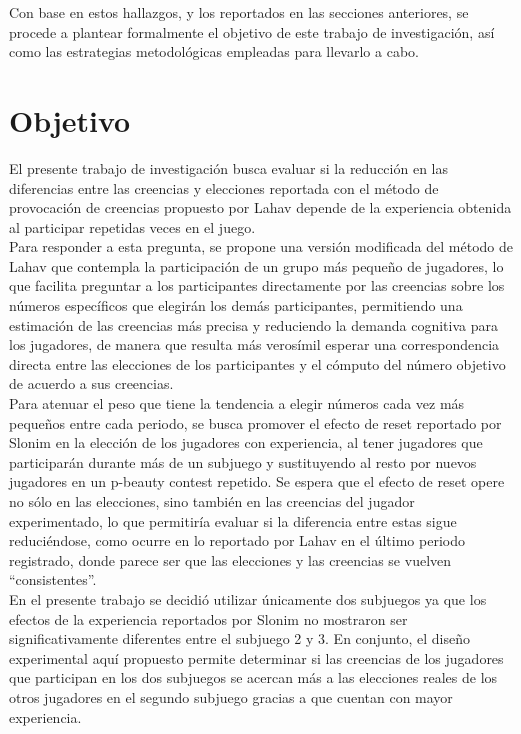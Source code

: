 Con base en estos hallazgos, y los reportados en las secciones anteriores, se procede a plantear formalmente el objetivo de este trabajo de investigación, así como las estrategias metodológicas empleadas para llevarlo a cabo. \\

\section{Objetivo}

El presente trabajo de investigación busca evaluar si la reducción en las diferencias entre las creencias y elecciones reportada con el método de provocación de creencias propuesto por Lahav \parencite*{Lahav2015} depende de la experiencia obtenida al participar repetidas veces en el juego.\\

Para responder a esta pregunta, se propone una versión modificada del método de Lahav \parencite*{Lahav2015} que contempla la participación de un grupo más pequeño de jugadores, lo que facilita preguntar a los participantes directamente por las creencias sobre los números específicos que elegirán los demás participantes, permitiendo una estimación de las creencias más precisa y reduciendo la demanda cognitiva para los jugadores, de manera que resulta más verosímil esperar una correspondencia directa entre las elecciones de los participantes y el cómputo del número objetivo de acuerdo a sus creencias.\\

Para atenuar el peso que tiene la tendencia a elegir números cada vez más pequeños entre cada periodo, se busca promover el efecto de reset reportado por Slonim \parencite*{Slonim2005} en la elección de los jugadores con experiencia, al tener jugadores que participarán durante más de un subjuego y sustituyendo al resto por nuevos jugadores en un p-beauty contest repetido. Se espera que el efecto de reset opere no sólo en las elecciones, sino también en las creencias del jugador experimentado, lo que permitiría evaluar si la diferencia entre estas sigue reduciéndose, como ocurre en lo reportado por Lahav \parencite*{Lahav2015} en el último periodo registrado, donde parece ser que las elecciones y las creencias se vuelven “consistentes”.\\

En el presente trabajo se decidió utilizar únicamente dos subjuegos ya que los efectos de la experiencia reportados por Slonim \parencite*{Slonim2005} no mostraron ser significativamente diferentes entre el subjuego 2 y 3. En conjunto, el diseño experimental aquí propuesto permite determinar si las creencias de los jugadores que participan en los dos subjuegos se acercan más a las elecciones reales de los otros jugadores en el segundo subjuego gracias a que cuentan con mayor experiencia.\\

